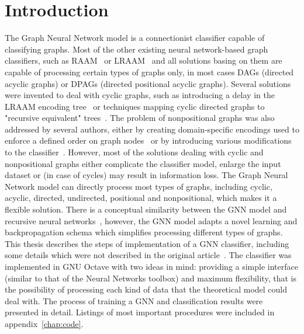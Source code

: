 
\chapter{Introduction}
The Graph Neural Network model is a connectionist classifier capable of classifying graphs. Most of the other existing neural network-based graph classifiers, such as RAAM~\cite{pollack1990recursive} or  LRAAM~\cite{sperduti1994labelling} and all solutions basing on them are capable of processing certain types of graphs only, in most cases DAGs (directed acyclic graphs) or DPAGs (directed positional acyclic graphs).
Several solutions were invented to deal with cyclic graphs, such as introducing a delay in the LRAAM encoding tree~\cite{goulon2005hopfield} or techniques mapping cyclic directed graphs to "recursive equivalent" trees~\cite{bianchini2003backpropagation}.
The problem of nonpositional graphs was also addressed by several authors, either by creating domain-specific encodings used to enforce a defined order on graph nodes~\cite{ivanciuc2003canonical} or by introducing various modifications to the classifier~\cite{bianchini2005recursive}.
However, most of the solutions dealing with cyclic and nonpositional graphs either complicate the classifier model, enlarge the input dataset or (in case of cycles) may result in information loss. The Graph Neural Network model can directly process most types of graphs, including cyclic, acyclic, directed, undirected, positional and nonpositional, which makes it a flexible solution.
There is a conceptual similarity between the GNN model and recursive neural networks~\cite{frasconi1998general}, however, the GNN model adapts a novel learning and backpropagation schema which simplifies processing different types of graphs.
This thesis describes the steps of implementation of a GNN classifier, including some details which were not described in the original article~\cite{scarselli2009graph}. The classifier was implemented in GNU Octave with two ideas in mind: providing a simple interface (similar to that of the Neural Networks toolbox) and maximum flexibility, that is the possibility of processing each kind of data that the theoretical model could deal with. The process of training a GNN and classification results were presented in detail. Listings of most important procedures were included in appendix~\ref{chap:code}.

